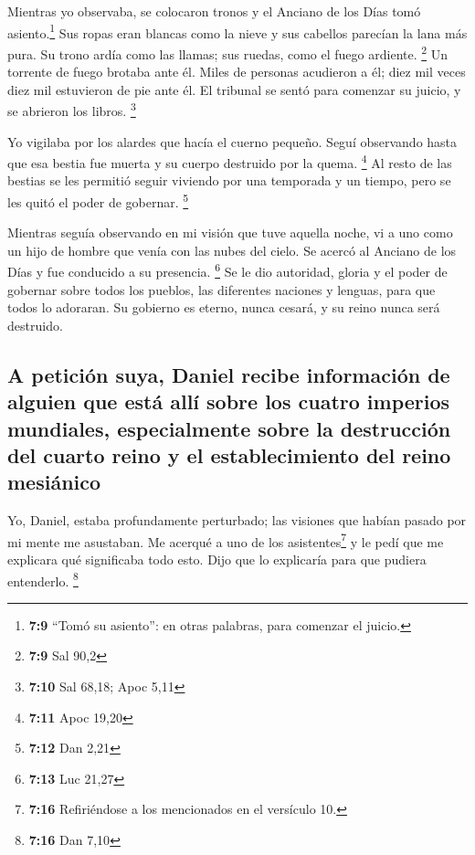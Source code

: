  Mientras yo observaba, se colocaron tronos y el Anciano
de los Días tomó asiento.\footnote{\textbf{7:9} ``Tomó su asiento'': en
  otras palabras, para comenzar el juicio.} Sus ropas eran blancas como
la nieve y sus cabellos parecían la lana más pura. Su trono ardía como
las llamas; sus ruedas, como el fuego ardiente. \footnote{\textbf{7:9}
  Sal 90,2}  Un torrente de fuego brotaba ante él. Miles
de personas acudieron a él; diez mil veces diez mil estuvieron de pie
ante él. El tribunal se sentó para comenzar su juicio, y se abrieron los
libros. \footnote{\textbf{7:10} Sal 68,18; Apoc 5,11}

 Yo vigilaba por los alardes que hacía el cuerno pequeño.
Seguí observando hasta que esa bestia fue muerta y su cuerpo destruido
por la quema. \footnote{\textbf{7:11} Apoc 19,20}  Al
resto de las bestias se les permitió seguir viviendo por una temporada y
un tiempo, pero se les quitó el poder de gobernar. \footnote{\textbf{7:12}
  Dan 2,21}

 Mientras seguía observando en mi visión que tuve aquella
noche, vi a uno como un hijo de hombre que venía con las nubes del
cielo. Se acercó al Anciano de los Días y fue conducido a su presencia.
\footnote{\textbf{7:13} Luc 21,27}  Se le dio autoridad,
gloria y el poder de gobernar sobre todos los pueblos, las diferentes
naciones y lenguas, para que todos lo adoraran. Su gobierno es eterno,
nunca cesará, y su reino nunca será destruido.

\hypertarget{a-peticiuxf3n-suya-daniel-recibe-informaciuxf3n-de-alguien-que-estuxe1-alluxed-sobre-los-cuatro-imperios-mundiales-especialmente-sobre-la-destrucciuxf3n-del-cuarto-reino-y-el-establecimiento-del-reino-mesiuxe1nico}{%
\subsection{A petición suya, Daniel recibe información de alguien que
está allí sobre los cuatro imperios mundiales, especialmente sobre la
destrucción del cuarto reino y el establecimiento del reino
mesiánico}\label{a-peticiuxf3n-suya-daniel-recibe-informaciuxf3n-de-alguien-que-estuxe1-alluxed-sobre-los-cuatro-imperios-mundiales-especialmente-sobre-la-destrucciuxf3n-del-cuarto-reino-y-el-establecimiento-del-reino-mesiuxe1nico}}

 Yo, Daniel, estaba profundamente perturbado; las
visiones que habían pasado por mi mente me asustaban.  Me
acerqué a uno de los asistentes\footnote{\textbf{7:16} Refiriéndose a
  los mencionados en el versículo 10.} y le pedí que me explicara qué
significaba todo esto. Dijo que lo explicaría para que pudiera
entenderlo. \footnote{\textbf{7:16} Dan 7,10}

